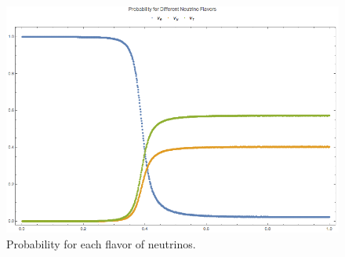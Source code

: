 \documentclass[letterpaper,12pt,english]{sphinxmanual}
\begin{document}
\begin{figure}[htbp]
\centering
\capstart

\includegraphics{numericalMSW3Flavor-probabilities.png}
\caption{Probability for each flavor of neutrinos.}\end{figure}
\end{document}
